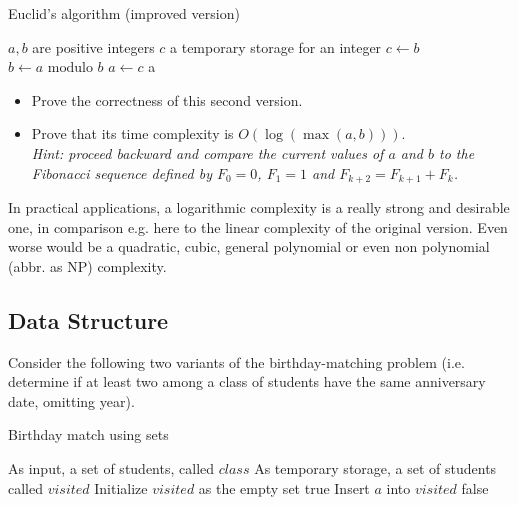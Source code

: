 \documentclass[12pt]{article}
\theoremstyle{plain}
\theoremstyle{remark}
\begin{document}
\begin{algorithm}[H]
\caption{Euclid's algorithm (improved version)}
\begin{algorithmic}
\Require $a, b$ are positive integers
\Require $c$ a temporary storage for an integer
\State $c \gets b$ 
\State $b \gets a \textrm{ modulo } b$
\State $a \gets c$
\EndWhile
\State \Return a
\EndFunction
\end{algorithmic}
\end{algorithm}

\begin{itemize}
\item Prove the correctness of this second version.
\item Prove that its time complexity is $O(\log(\max(a, b)))$.\\{\it Hint:
	proceed backward and compare the current values of $a$ and $b$ to the
		Fibonacci sequence defined by $F_0=0$, $F_1=1$ and $F_{k+2} =
		F_{k+1} + F_{k}$.}
\end{itemize}

In practical applications, a logarithmic complexity is a really strong 
and desirable one, in comparison e.g. here to the linear complexity of 
the original version. Even worse would be a quadratic, cubic, general polynomial
or even non polynomial (abbr. as NP) complexity.

\subsection{Data Structure}

Consider the following two variants of the birthday-matching problem (i.e.
determine if at least two among a class of students have the same anniversary
date, omitting year).

\begin{algorithm}[H]
\caption{Birthday match using sets}
\begin{algorithmic}
\Require As input, a set of students, called $class$
\Require As temporary storage, a set of students called $visited$
\State Initialize $visited$ as the empty set
\State \Return true
\EndIf
\EndFor
\State Insert $a$ into $visited$
\EndFor
\State \Return false
\end{algorithmic}
\end{algorithm}
\end{document}
